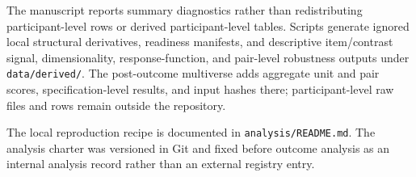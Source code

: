 \documentclass[12pt]{article}
\begin{document}
The manuscript reports summary diagnostics rather than redistributing
participant-level rows or derived participant-level tables. Scripts generate
ignored local structural derivatives, readiness manifests, and descriptive
item/contrast signal, dimensionality, response-function, and pair-level
robustness outputs under \texttt{data/derived/}. The post-outcome multiverse
adds aggregate unit and pair scores, specification-level results, and input
hashes there; participant-level raw files and rows remain outside the
repository.

The local reproduction recipe is documented in \texttt{analysis/README.md}. The
analysis charter was versioned in Git and fixed before outcome analysis as an
internal analysis record rather than an external registry entry.

\clearpage
\printbibliography
\end{document}

